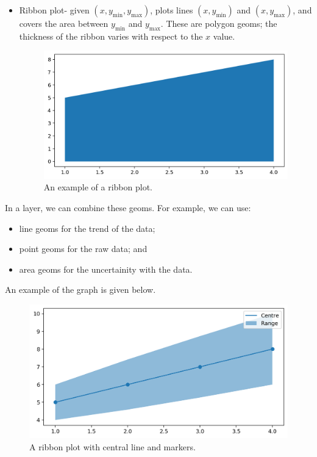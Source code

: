 \documentclass[a4paper, openany]{memoir}
\begin{document}
\begin{itemize}
    \item Ribbon plot- given $(x, y_{\min}, y_{\max})$, plots lines $(x, y_{\min})$ and $(x, y_{\max})$, and covers the area between $y_{\min}$ and $y_{\max}$. These are polygon geoms; the thickness of the ribbon varies with respect to the $x$ value.
    \begin{figure}[H]
        \centering
        \includegraphics[scale=0.4]{src/2.9 ribbon plot example.png}
        \caption{An example of a ribbon plot.}
    \end{figure}
\end{itemize}
In a layer, we can combine these geoms. For example, we can use:
\begin{itemize}
    \item line geoms for the trend of the data;
    \item point geoms for the raw data; and
    \item area geoms for the uncertainity with the data.
\end{itemize}
An example of the graph is given below.
\begin{figure}[H]
    \centering
    \includegraphics[scale=0.5]{src/2.10 ribbon plot with central line and markers.png}
    \caption{A ribbon plot with central line and markers.}
\end{figure}
\newpage
\end{document}
